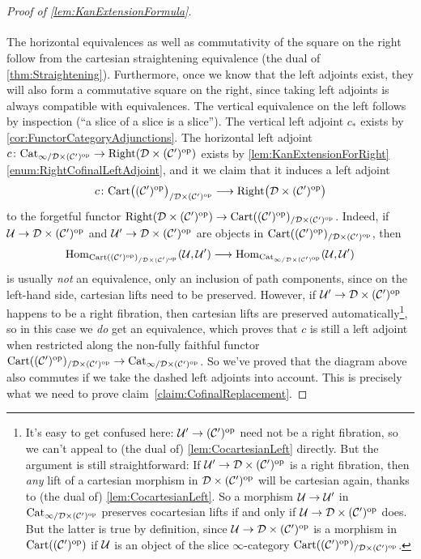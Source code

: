\begin{proof}[Proof of \cref{lem:KanExtensionFormula}]
\begin{equation*}
\begin{tikzcd}
		\end{tikzcd}
	\end{equation*}
	The horizontal equivalences as well as commutativity of the square on the right follow from the cartesian straightening equivalence (the dual of \cref{thm:Straightening}). Furthermore, once we know that the left adjoints exist, they will also form a commutative square on the right, since taking left adjoints is always compatible with equivalences. The vertical equivalence on the left follows by inspection (\enquote{a slice of a slice is a slice}). The vertical left adjoint $c_*$ exists by \cref{cor:FunctorCategoryAdjunctions}. The horizontal left adjoint $c\colon \mathrm{Cat}_{\infty/\mathcal{D}\times(\mathcal{C}')^{\mathrm{op}}}\rightarrow \mathrm{Right}(\mathcal{D}\times(\mathcal{C}')^{\mathrm{op}})$ exists by \cref{lem:KanExtensionForRight}\cref{enum:RightCofinalLeftAdjoint}, and it we claim that it induces a left adjoint
	\begin{equation*}
		c\colon  \mathrm{Cart}\bigl((\mathcal{C}')^{\mathrm{op}}\bigr)_{/\mathcal{D}\times(\mathcal{C}')^{\mathrm{op}}}\longrightarrow \mathrm{Right}\bigl(\mathcal{D}\times(\mathcal{C}')^{\mathrm{op}}\bigr)
	\end{equation*}
	to the forgetful functor $\mathrm{Right}(\mathcal{D}\times(\mathcal{C}')^{\mathrm{op}})\rightarrow \mathrm{Cart}((\mathcal{C}')^{\mathrm{op}})_{/\mathcal{D}\times(\mathcal{C}')^{\mathrm{op}}}$. Indeed, if $\mathcal{U}\rightarrow \mathcal{D}\times(\mathcal{C}')^{\mathrm{op}}$ and $\mathcal{U}'\rightarrow \mathcal{D}\times(\mathcal{C}')^{\mathrm{op}}$ are objects in $\mathrm{Cart}((\mathcal{C}')^{\mathrm{op}})_{/\mathcal{D}\times(\mathcal{C}')^{\mathrm{op}}}$, then
	\begin{equation*}
		\operatorname{Hom}_{\mathrm{Cart}((\mathcal{C}')^{\mathrm{op}})_{/\mathcal{D}\times(\mathcal{C}')^{\mathrm{op}}}}(\mathcal{U},\mathcal{U}')\longrightarrow \operatorname{Hom}_{\mathrm{Cat}_{\infty/\mathcal{D}\times(\mathcal{C}')^{\mathrm{op}}}}(\mathcal{U},\mathcal{U}')
	\end{equation*}
	is usually \emph{not} an equivalence, only an inclusion of path components, since on the left-hand side, cartesian lifts need to be preserved. However, if $\mathcal{U}'\rightarrow \mathcal{D}\times(\mathcal{C}')^{\mathrm{op}}$ happens to be a right fibration, then cartesian lifts are preserved automatically\footnote{It's easy to get confused here: $\mathcal{U}'\rightarrow (\mathcal{C}')^{\mathrm{op}}$ need not be a right fibration, so we can't appeal to (the dual of) \cref{lem:CocartesianLeft} directly. But the argument is still straightforward: If $\mathcal{U}'\rightarrow \mathcal{D}\times (\mathcal{C}')^{\mathrm{op}}$ is a right fibration, then \emph{any} lift of a cartesian morphism in $\mathcal{D}\times(\mathcal{C}')^{\mathrm{op}}$ will be cartesian again, thanks to (the dual of) \cref{lem:CocartesianLeft}. So a morphism $\mathcal{U}\rightarrow\mathcal{U}'$ in $\mathrm{Cat}_{\infty/\mathcal{D}\times(\mathcal{C}')^{\mathrm{op}}}$ preserves cocartesian lifts if and only if $\mathcal{U}\rightarrow \mathcal{D}\times(\mathcal{C}')^{\mathrm{op}}$ does. But the latter is true by definition, since $\mathcal{U}\rightarrow \mathcal{D}\times(\mathcal{C}')^{\mathrm{op}}$ is a morphism in $\mathrm{Cart}((\mathcal{C}')^{\mathrm{op}})$ if $\mathcal{U}$ is an object of the slice $\infty$-category $\mathrm{Cart}((\mathcal{C}')^{\mathrm{op}})_{/\mathcal{D}\times(\mathcal{C}')^{\mathrm{op}}}$.}, so in this case we \emph{do} get an equivalence, which proves that $c$ is still a left adjoint when restricted along the non-fully faithful functor $\mathrm{Cart}((\mathcal{C}')^{\mathrm{op}})_{/\mathcal{D}\times(\mathcal{C}')^{\mathrm{op}}}\rightarrow \mathrm{Cat}_{\infty/\mathcal{D}\times(\mathcal{C}')^{\mathrm{op}}}$. So we've proved that the diagram above also commutes if we take the dashed left adjoints into account. This is precisely what we need to prove claim~\cref{claim:CofinalReplacement}.
	

\end{proof}
